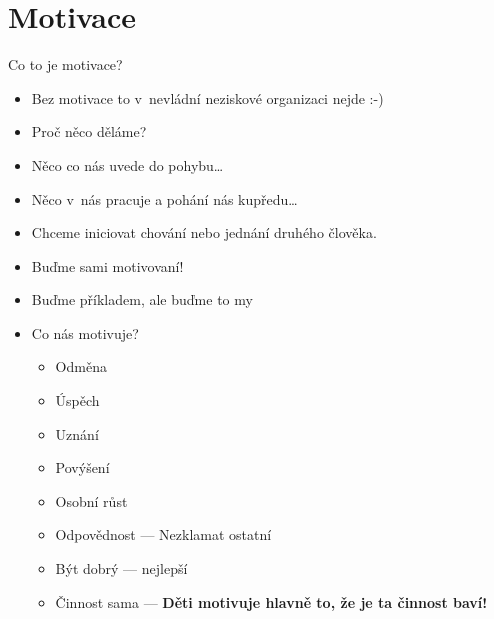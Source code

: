 \documentclass[compress,xelatex,xcolor=dvipsnames,hyperref={pdfpagelabels=false},print]{beamer}
\begin{document}
\section{Motivace}

\begin{frame}{Co to je motivace?}
\begin{multicols}{2}
\begin{itemize}
\item Bez motivace to v~nevládní neziskové organizaci nejde :-)
\item Proč něco děláme?
\item Něco co nás uvede do pohybu\ldots
\item Něco v~nás pracuje a pohání nás kupředu\ldots
\item Chceme iniciovat chování nebo jednání druhého člověka.
\item Buďme sami motivovaní!
\item Buďme příkladem, ale buďme to my
\end{itemize}
\columnbreak
\begin{itemize}
\item Co nás motivuje?
 \begin{itemize}
 \item Odměna
 \item Úspěch
 \item Uznání
 \item Povýšení
 \item Osobní růst
 \item Odpovědnost --- Nezklamat ostatní
 \item Být dobrý --- nejlepší
 \item Činnost sama --- \textbf{Děti motivuje hlavně to, že je ta činnost baví!}
 \end{itemize}
\end{itemize}
\end{multicols}
\end{frame}
\end{document}
